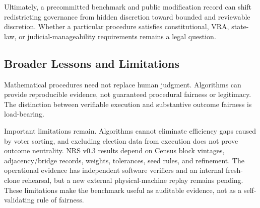 Ultimately, a precommitted benchmark and public modification record can shift
redistricting governance from hidden discretion toward bounded and reviewable
discretion. Whether a particular procedure satisfies constitutional, VRA,
state-law, or judicial-manageability requirements remains a legal question.

\subsection{Broader Lessons and Limitations}

Mathematical procedures need not replace human judgment. Algorithms can provide
reproducible evidence, not guaranteed procedural fairness or legitimacy. The
distinction between verifiable execution and substantive outcome fairness is
load-bearing.

Important limitations remain. Algorithms cannot eliminate efficiency gaps
caused by voter sorting, and excluding election data from execution does not
prove outcome neutrality. NRS v0.3 results depend on Census block vintages,
adjacency/bridge records, weights, tolerances, seed rules, and refinement. The
operational evidence has independent software verifiers and an internal
fresh-clone rehearsal, but a new external physical-machine replay remains
pending. These limitations make the benchmark useful as auditable evidence,
not as a self-validating rule of fairness.
